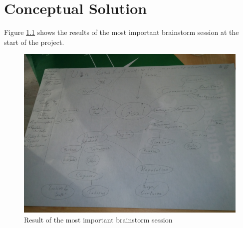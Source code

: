 \chapter{Conceptual Solution}\label{app:brainstorm1}
Figure \ref{fig:brainstorm} shows the results of the most important brainstorm session at the start of the project.
\begin{figure}[ht]
    \centering
    \includegraphics*[width=\textwidth]{./media/brainstorm}
    \caption{Result of the most important brainstorm session}
    \label{fig:brainstorm}
\end{figure}
